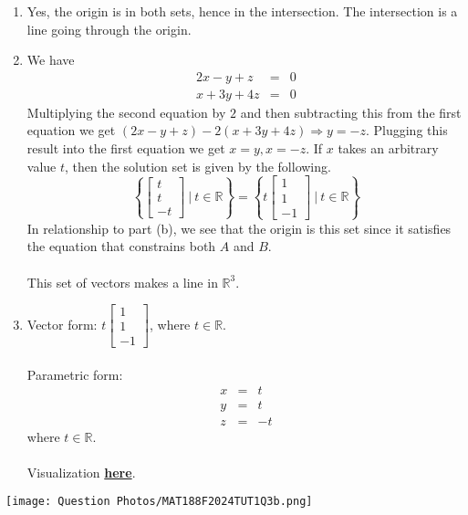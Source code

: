 \begin{SaveQuestion}
\begin{enumerate}
\begin{enumerate}
	\item Yes, the origin is in both sets, hence in the intersection. The intersection is a line going through the origin\PullLS*[1].
        \item We have \begin{eqnarray*} 2x-y+z&=&0\\ x+3y+4z&=&0 \end{eqnarray*}
        Multiplying the second equation by $2$ and then subtracting this from the first equation we get $(2x - y + z) - 2(x + 3y + 4z) \Longrightarrow y = -z$.
	Plugging this result into the first equation we get $x=y, x=-z$. 
        If $x$ takes an arbitrary value $t$, then the solution set is given by the following.  
        $$\left\{\begin{bmatrix} t \\ t \\ -t \end{bmatrix} \ | \ t\in \mathbb{R}\right\}=\left\{t\begin{bmatrix} 1 \\ 1 \\ -1 \end{bmatrix} \ | \ t\in \mathbb{R}\right\}$$ 
        In relationship to part (b), we see that the origin is this set since it satisfies the equation that constrains both $A$ and $B$. \\ \\
        This set of vectors makes a line in $\mathbb{R}^3$\PullLS*[3]. 
        \item Vector form: $t\begin{bmatrix} 1\\1\\-1 \end{bmatrix}$, where $t\in \mathbb{R}$. \\ \\
        Parametric form: \begin{eqnarray*} x&=&t\\y&=&t\\z&=&-t \end{eqnarray*} where $t\in \mathbb{R}$. \\ \\
        Visualization \href{https://www.geogebra.org/3d/kz5chu46}{\textbf{here}}\PullLS*[3].
        \end{enumerate}
    \end{enumerate}
    \begin{center}
        \texttt{[image: Question Photos/MAT188F2024TUT1Q3b.png]}
    \end{center}
\end{SaveQuestion}



